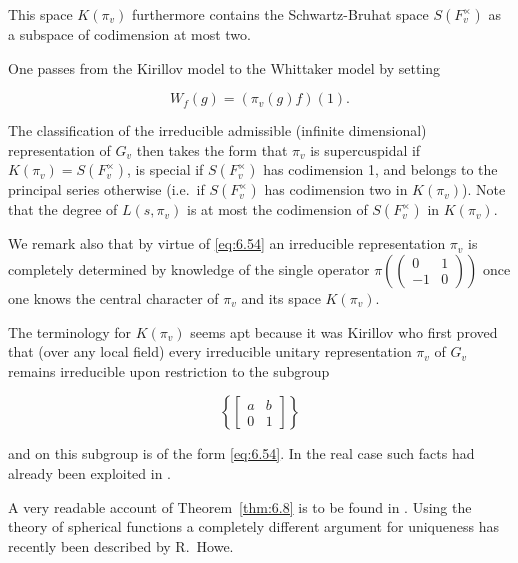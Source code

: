 This space $K(\pi_v)$ furthermore contains the Schwartz-Bruhat space $S(F_v^{\times})$ as a subspace of codimension at most two.

One passes from the Kirillov model to the Whittaker model by setting

\[
W_f(g) = (\pi_v(g)f)(1).
\]

The classification of the irreducible admissible (infinite dimensional) representation of $G_v$ then takes the form that $\pi_v$ is supercuspidal if $K(\pi_v) = S(F_v^{\times})$, is special if $S(F_v^{\times})$ has codimension 1, and belongs to the principal series otherwise (i.e.\ if $S(F_v^{\times})$ has codimension two in $K(\pi_v)$). Note that the degree of $L(s, \pi_v)$ is at most the codimension of $S(F_v^{\times})$ in $K(\pi_v)$.

We remark also that by virtue of \eqref{eq:6.54} an irreducible representation $\pi_v$ is completely determined by knowledge of the single operator $\pi\!\left(\begin{pmatrix} 0 & 1 \\ -1 & 0 \end{pmatrix}\right)$ once one knows the central character of $\pi_v$ and its space $K(\pi_v)$.

The terminology for $K(\pi_v)$ seems apt because it was Kirillov who first proved that (over any local field) every irreducible unitary representation $\pi_v$ of $G_v$ remains irreducible upon restriction to the subgroup

\[
\left\{\begin{bmatrix} a & b \\ 0 & 1 \end{bmatrix}\right\}
\]

and on this subgroup is of the form \eqref{eq:6.54}. In the real case such facts had already been exploited in \cite{KunzeStein}.

A very readable account of Theorem~\ref{thm:6.8} is to be found in \cite{Godement}. Using the theory of spherical functions a completely different argument for uniqueness has recently been described by R.~Howe.
